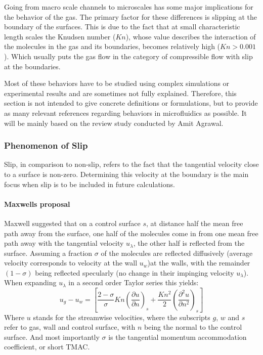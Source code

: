 Going from macro scale channels to microscales has some major implications for the behavior of the gas.
The primary factor for these differences is slipping at the boundary of the surfaces.
This is due to the fact that at small characteristic length scales the Knudsen number ($Kn$), whose value describes the interaction of the molecules in the gas and its boundaries, becomes relatively high ($Kn > 0.001$).
Which usually puts the gas flow in the category of compressible flow with slip at the boundaries.

Most of these behaviors have to be studied using complex simulations or experimental results and are sometimes not fully explained.
Therefore, this section is not intended to give concrete definitions or formulations, but to provide as many relevant references regarding behaviors in microfluidics as possible.
It will be mainly based on the review study conducted by Amit Agrawal.
\cite{agrawal_comprehensive_2011}

\subsubsection*{Phenomenon of Slip}
Slip, in comparison to non-slip, refers to the fact that the tangential velocity close to a surface is non-zero.
Determining this velocity at the boundary is the main focus when slip is to be included in future calculations.

\paragraph*{Maxwells proposal}
Maxwell suggested that on a control surface $s$, at distance half the mean free path away from the surface, one half of the molecules come in from one mean free path away with the tangential velocity $u_\lambda$, the other half is reflected from the surface.
Assuming a fraction $\sigma$ of the molecules are reflected diffusively (average velocity corresponds to velocity at the wall $u_w$)at the walls, with the remainder $(1-\sigma)$ being reflected specularly (no change in their impinging velocity $u_\lambda$).
When expanding $u_\lambda$ in a second order Taylor series this yields:
$$
	u_g - u_w =
	\left[
		\frac{2-\sigma}{\sigma}Kn\left(\frac{\partial u}{\partial n}\right)_s
		+ \frac{Kn^2}{2} \left(\frac{\partial^2 u}{\partial n^2}\right)_s
	\right]
$$ 
Where $u$ stands for the streamwise velocities, where the subscripts $g$, $w$ and $s$ refer to gas, wall and control surface, with $n$ being the normal to the control surface.
And most importantly $\sigma$ is the tangential momentum accommodation coefficient, or short TMAC.

